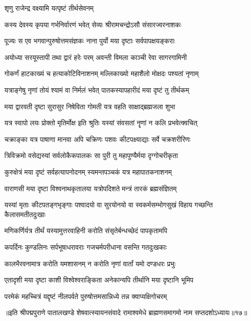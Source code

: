 \onelineshloka
{शृणु राजेन्द्र वक्ष्यामि यत्पृष्टं तीर्थसेवनम्}%

\twolineshloka
{कस्य देवस्य कृपया गर्भनिर्वारणं भवेत्}
{सेव्यः श्रीरामचन्द्रोऽसौ संसारज्वरनाशकः}%

\twolineshloka
{पूज्यः स एव भगवान्पुरुषोत्तमसंज्ञकः}
{नाना पुर्यो मया दृष्टाः सर्वपापक्षयङ्कराः}%

\twolineshloka
{अयोध्या सरयूस्तापी तथा द्वारं हरेः परम्}
{अवन्ती विमला काञ्ची रेवा सागरगामिनी}%

\twolineshloka
{गोकर्णं हाटकाख्यं च हत्याकोटिविनाशनम्}
{मल्लिकाख्यो महाशैलो मोक्षदः पश्यतां नृणाम्}%

\twolineshloka
{यत्राङ्गेषु नृणां तोयं श्यामं वा निर्मलं भवेत्}
{पातकस्यापहारीदं मया दृष्टं तु तीर्थकम्}%

\twolineshloka
{मया द्वारवती दृष्टा सुरासुर निषेविता}
{गोमती यत्र वहति साक्षाद्ब्रह्मजला शुभा}%

\twolineshloka
{यत्र स्वापो लयः प्रोक्तो मृतिर्मोक्ष इति श्रुतिः}
{यस्यां संवसतां नॄणां न कलि प्रभवेत्क्वचित्}%

\twolineshloka
{चक्राङ्का यत्र पाषाणा मानवा अपि चक्रिणः}
{पशवः कीटपक्ष्याद्याः सर्वे चक्रशरीरिणः}%

\twolineshloka
{त्रिविक्रमो वसेद्यस्यां सर्वलोकैकपालकः}
{सा पुरी तु महापुण्यैर्मया दृग्गोचरीकृता}%

\twolineshloka
{कुरुक्षेत्रं मया दृष्टं सर्वहत्यापनोदनम्}
{स्यमन्तपञ्चकं यत्र महापातकनाशनम्}%

\twolineshloka
{वाराणसी मया दृष्टा विश्वनाथकृतालया}
{यत्रोपदिशते मन्त्रं तारकं ब्रह्मसंज्ञितम्}%

\fourlineindentedshloka
{यस्यां मृताः कीटपतङ्गभृङ्गाः}
{पश्वादयो वा सुरयोनयो वा}
{स्वकर्मसम्भोगसुखं विहाय}
{गच्छन्ति कैलासमतीतदुःखाः}%

\twolineshloka
{मणिकर्णिर्यत्र तीर्थं यस्यामुत्तरवाहिनी}
{करोति संसृतेर्बन्धच्छेदं पापकृतामपि}%

\twolineshloka
{कपर्दिनः कुण्डलिनः सर्पभूषाधरावराः}
{गजचर्मपरीधाना वसन्ति गतदुःखकाः}%

\twolineshloka
{कालभैरवनामात्र करोति यमशासनम्}
{न करोति नृणां वार्तां यमो दण्डधरः प्रभुः}%

\twolineshloka
{एतादृशी मया दृष्टा काशी विश्वेश्वराङ्किता}
{अनेकान्यपि तीर्थानि मया दृष्टानि भूमिप}%

\twolineshloka
{परमेकं महच्चित्रं यद्दृष्टं नीलपर्वते}
{पुरुषोत्तमसान्निध्ये तन्न क्वाप्यक्षिगोचरम्}%

{॥इति श्रीपद्मपुराणे पातालखण्डे शेषवात्स्यायनसंवादे रामाश्वमेधे ब्राह्मणसमागमो नाम सप्तदशोऽध्यायः॥१७॥}

